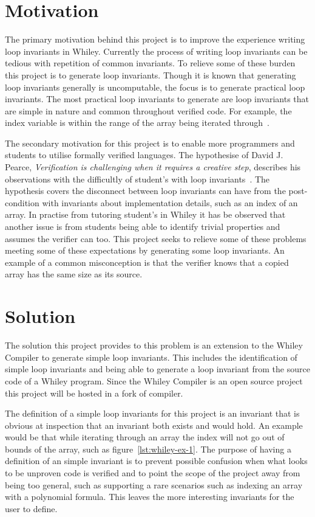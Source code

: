 \section{Motivation}

The primary motivation behind this project is to improve the experience writing
loop invariants in Whiley.
Currently the process of writing loop invariants can be tedious with 
repetition of common invariants.
To relieve some of these burden this project is to generate loop invariants.
Though it is known that generating loop invariants generally is uncomputable,
the focus is to generate practical loop invariants. 
The most practical loop invariants to generate are loop invariants that
are simple in nature and common throughout verified code.
For example, the index variable is within the range of the array being
iterated through~\cite{loop-patterns}.

The secondary motivation for this project is to enable more programmers and
students to utilise formally verified languages.
The hypothesise of David J. Pearce, \textit{Verification is challenging when it requires a creative step},
describes his observations with the difficultly of student's with loop invariants~\cite{spec-usability}.
The hypothesis covers the disconnect between loop invariants can have from the
post-condition with invariants about implementation details, such as an index
of an array.
In practise from tutoring student's in Whiley
it has be observed that another issue is from students being able to identify trivial
properties and assumes the verifier can too.
This project seeks to relieve some of these problems meeting some of these
expectations by generating some loop invariants.
An example of a common misconception is that the verifier knows that a copied
array has the same size as its source.

\section{Solution}

The solution this project provides to this problem is an extension to
the Whiley Compiler to generate simple loop invariants.
This includes the identification of simple loop invariants and being able
to generate a loop invariant from the source code of a Whiley program.
Since the Whiley Compiler is an open source project this project will be
hosted in a fork of compiler.

The definition of a simple loop invariants for this project is an invariant that is
obvious at inspection that an invariant both exists and would hold.
An example would be that while iterating through an array the index
will not go out of bounds of the array, such as figure~\ref{lst:whiley-ex-1}.
The purpose of having a definition of an simple invariant is to prevent
possible confusion when what looks to be unproven code is verified and to point
the scope of the project away from being too general, such as supporting
a rare scenarios such as indexing an array with a polynomial formula.
This leaves the more interesting invariants for the user to define.

